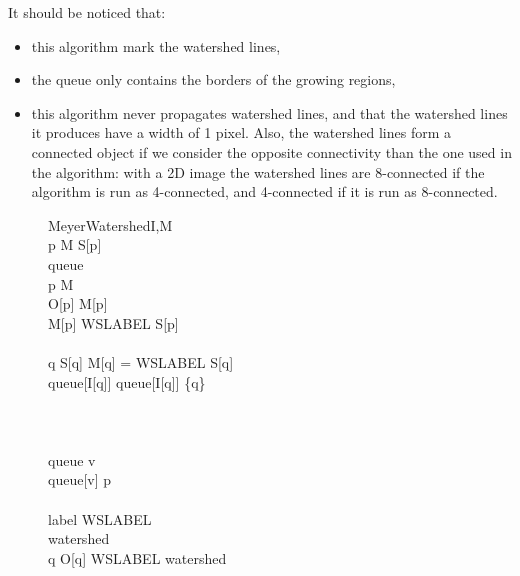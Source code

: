 \documentclass{InsightArticle}
\begin{document}
It should be noticed that:
\begin{itemize}
  \item this algorithm mark the watershed lines,
  \item the queue only contains the borders of the growing regions,
  \item this algorithm never propagates watershed
lines, and that the watershed lines it produces have a width of 1 pixel.
Also, the watershed lines form a connected object if we consider the
opposite connectivity than the one used in the algorithm: with a 2D
image the watershed lines are 8-connected if the algorithm is run
as 4-connected, and 4-connected if it is run as 8-connected.
\end{itemize}

\begin{figure}[htbp]
\centering
\small
\begin{pseudocode}[framebox]{MeyerWatershed}{I,M}
 \\
\FOREACH p \in M \DO
  S[p] \GETS \FALSE \\
queue \GETS \emptyset \\
\FOREACH p \in M \DO
\BEGIN
  \\
  O[p] \GETS M[p] \\
  \IF M[p] \neq WSLABEL
  \THEN
  \BEGIN
    S[p] \GETS \TRUE \\
    \\
    \FOREACH q \in {} \DO
    \BEGIN
      \IF \neg S[q] \AND M[q] = WSLABEL 
      \THEN
      \BEGIN
        S[q] \GETS \TRUE \\
        queue[I[q]] \GETS queue[I[q]] \cup \{q\} \\
      \END
    \END
  \END
\END
\\
\\
 \\
\WHILE queue \neq \emptyset \DO
\BEGIN
  v \GETS {}\\
  \WHILE queue[v] \neq \emptyset \DO
  \BEGIN
    p \GETS {} \\
     \\
    label \GETS WSLABEL \\
    watershed \GETS \FALSE \\
    \FOREACH q \in {} \DO
    \BEGIN
      \IF O[q] \neq WSLABEL \AND \neg watershed

\end{pseudocode}
\end{figure}
\end{document}
